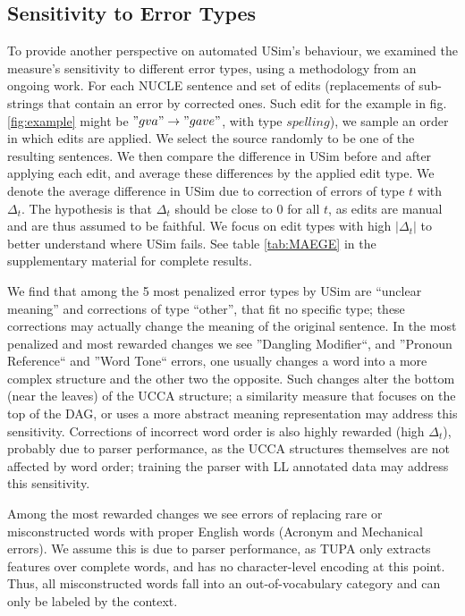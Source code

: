 \documentclass[a4paper, 11pt]{article}
\begin{document}
\subsection{Sensitivity to Error Types}\label{subsec:types}
To provide another perspective on automated {\sc USim}'s behaviour,
we examined the measure's sensitivity to different error types, using a methodology from an ongoing work. 
For each NUCLE sentence and set of edits (replacements of sub-strings that contain an error by corrected ones. Such edit for the example in fig. \ref{fig:example} might be $"gva"\rightarrow"gave"$, with type $spelling$), we sample an order in which edits are applied.
We select the source randomly to be one of the resulting sentences. 
We then compare the difference in {\sc USim} before and after applying each edit, and average these differences by the applied edit type. 
We denote the average difference in {\sc USim} due to correction of errors of type $t$ with $\Delta_t$.
The hypothesis is that $\Delta_t$ should be close to 0 for all $t$, as edits are manual and are thus assumed to be faithful.
We focus on edit types with high $|\Delta_t|$ to better understand where {\sc USim} fails. See table \ref{tab:MAEGE} in the supplementary material for complete results.

We find that among the 5 most penalized error types by {\sc USim} are ``unclear meaning'' and corrections of type ``other'', that fit no specific type; these corrections may actually change the meaning of the original sentence. In the most penalized and most rewarded changes we see ''Dangling Modifier``, and ''Pronoun Reference`` and ''Word Tone`` errors, one usually changes a word into a more complex structure and the other two the opposite. Such changes alter the bottom (near the leaves) of the UCCA structure; a similarity measure that focuses on the top of the DAG, or uses a more abstract meaning representation may address this sensitivity. Corrections of incorrect word order is also highly rewarded (high $\Delta_t$), probably due to parser performance, as the UCCA structures themselves are not affected by word order; training the parser with LL annotated data may address this sensitivity.
	
Among the most rewarded changes we see errors of replacing rare or misconstructed words with proper English words (Acronym and Mechanical errors). We assume this is due to parser performance, as TUPA only extracts features over complete words, and has no character-level encoding at this point. Thus, all misconstructed words fall into an out-of-vocabulary category and can only be labeled by the context.
\end{document}
